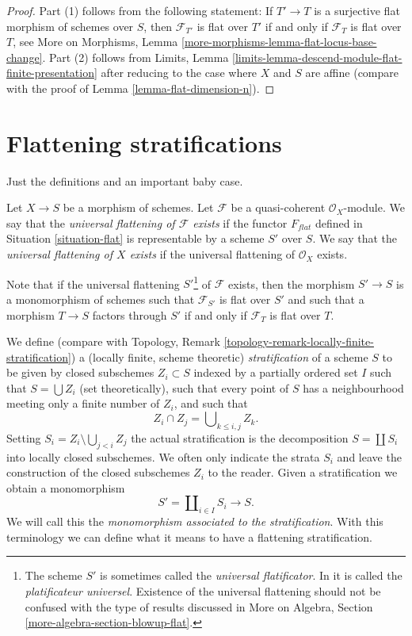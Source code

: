\begin{proof}
Part (1) follows from the following statement: If $T' \to T$ is a surjective
flat morphism of schemes over $S$, then $\mathcal{F}_{T'}$ is flat over $T'$
if and only if $\mathcal{F}_T$ is flat over $T$, see
More on Morphisms, Lemma \ref{more-morphisms-lemma-flat-locus-base-change}.
Part (2) follows from
Limits, Lemma \ref{limits-lemma-descend-module-flat-finite-presentation}
after reducing to the case where $X$ and $S$ are affine (compare with
the proof of
Lemma \ref{lemma-flat-dimension-n}).
\end{proof}




\section{Flattening stratifications}
\label{section-flattening}

\noindent
Just the definitions and an important baby case.

\begin{definition}
\label{definition-flattening}
Let $X \to S$ be a morphism of schemes.
Let $\mathcal{F}$ be a quasi-coherent $\mathcal{O}_X$-module.
We say that the {\it universal flattening of $\mathcal{F}$ exists}
if the functor $F_{flat}$ defined in Situation \ref{situation-flat}
is representable by a scheme $S'$ over $S$.
We say that the {\it universal flattening of $X$ exists}
if the universal flattening of $\mathcal{O}_X$ exists.
\end{definition}

\noindent
Note that if the universal flattening $S'$\footnote{The scheme $S'$ is sometimes
called the {\it universal flatificator}. In \cite{GruRay} it is called
the {\it platificateur universel}. Existence of the universal flattening
should not be confused with the type of results discussed in
More on Algebra, Section \ref{more-algebra-section-blowup-flat}.} of
$\mathcal{F}$ exists, then the morphism $S' \to S$ is a monomorphism of schemes
such that $\mathcal{F}_{S'}$ is flat over $S'$ and such that a
morphism $T \to S$ factors through $S'$ if and only if $\mathcal{F}_T$
is flat over $T$.

\medskip\noindent
We define (compare with
Topology, Remark \ref{topology-remark-locally-finite-stratification})
a (locally finite, scheme theoretic) {\it stratification} of a scheme $S$
to be given by closed subschemes $Z_i \subset S$ indexed by a partially
ordered set $I$ such that
$S = \bigcup Z_i$ (set theoretically), such that every point of $S$ has
a neighbourhood meeting only a finite number of $Z_i$, and such that
$$
Z_i \cap Z_j = \bigcup\nolimits_{k \leq i, j} Z_k.
$$
Setting $S_i = Z_i \setminus \bigcup_{j < i} Z_j$ the actual
stratification is the decomposition $S = \coprod S_i$ into
locally closed subschemes. We often only indicate the strata
$S_i$ and leave the construction of the closed subschemes $Z_i$
to the reader. Given a stratification we obtain a monomorphism
$$
S' = \coprod\nolimits_{i \in I} S_i \longrightarrow S.
$$
We will call this the {\it monomorphism associated to the stratification}.
With this terminology we can define what it means to have a flattening
stratification.

